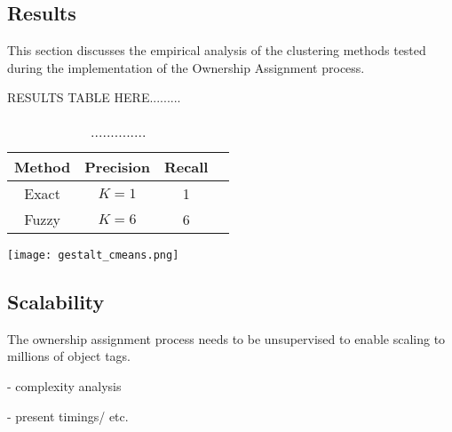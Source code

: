 \subsection{Results}
This section discusses the empirical analysis of the clustering methods tested during the implementation of the Ownership Assignment process. 

RESULTS TABLE HERE.........
\begin{table}[h!]
	\begin{center}
		\begin{tabular}{ |c|c|c|c| } 
			\hline
			Method & Precision & Recall \\
			\hline
                Exact & $K=1$ & 1 \\ 
			Fuzzy & $K=6$ & 6  \\ 
			\hline
		\end{tabular}
		\label{table:clustering}
		\caption{..............}
	\end{center}
\end{table}


\begin{figure*}[ht]
\label{fig:cmeans}        
\texttt{[image: gestalt\_cmeans.png]}
\centering
\caption[width=\textwidth]{............}
\end{figure*}


\subsection{Scalability}
The ownership assignment process needs to be unsupervised to enable scaling to millions of object tags. 

- complexity analysis

- present timings/ etc.







